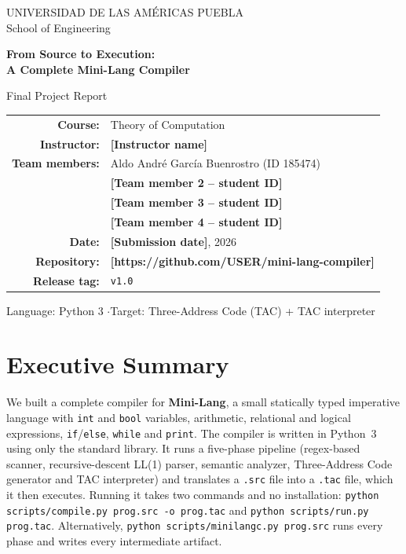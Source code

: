 \documentclass[11pt,letterpaper]{article}
\newcommand{\fillin}[1]{\textcolor{fill}{\textbf{[#1]}}}   %
\newcommand{\code}[1]{\texttt{#1}}
\begin{document}
\begin{titlepage}
\centering
\vspace*{1.2cm}
{\sffamily\small UNIVERSIDAD DE LAS AMÉRICAS PUEBLA\\ School of Engineering\par}
\vspace{2.2cm}
{\sffamily\color{accent}\Huge\bfseries From Source to Execution:\\[0.25em] A Complete Mini-Lang Compiler\par}
\vspace{0.8cm}
{\Large Final Project Report\par}
\vspace{2cm}
\begin{tabular}{rl}
\textbf{Course:} & Theory of Computation \\
\textbf{Instructor:} & \fillin{Instructor name} \\[0.6em]
\textbf{Team members:} & Aldo André García Buenrostro (ID 185474) \\
 & \fillin{Team member 2 -- student ID} \\
 & \fillin{Team member 3 -- student ID} \\
 & \fillin{Team member 4 -- student ID} \\[0.6em]
\textbf{Date:} & \fillin{Submission date}, 2026 \\
\textbf{Repository:} & \fillin{https://github.com/USER/mini-lang-compiler} \\
\textbf{Release tag:} & \code{v1.0} \\
\end{tabular}
\vfill
{\small Language: Python 3 \quad$\cdot$\quad Target: Three-Address Code (TAC) + TAC interpreter\par}
\end{titlepage}

\setcounter{tocdepth}{1}
\tableofcontents
\newpage

\section{Executive Summary}

We built a complete compiler for \textbf{Mini-Lang}, a small statically typed imperative language with \code{int} and \code{bool} variables, arithmetic, relational and logical expressions, \code{if}/\code{else}, \code{while} and \code{print}. The compiler is written in Python~3 using only the standard library. It runs a five-phase pipeline (regex-based scanner, recursive-descent LL(1) parser, semantic analyzer, Three-Address Code generator and TAC interpreter) and translates a \code{.src} file into a \code{.tac} file, which it then executes. Running it takes two commands and no installation: \code{python scripts/compile.py prog.src -o prog.tac} and \code{python scripts/run.py prog.tac}. Alternatively, \code{python scripts/minilangc.py prog.src} runs every phase and writes every intermediate artifact.
\end{document}
